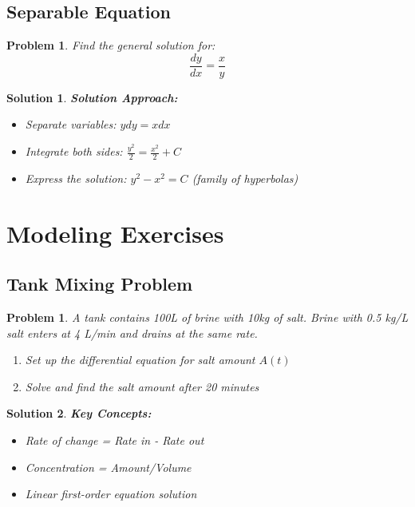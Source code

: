 \documentclass[12pt, letterpaper]{book}
\newcounter{problemcounter}[chapter]
\theoremstyle{problemstyle}
\newtheorem{problem}[problemcounter]{Problem}
\theoremstyle{solutionstyle}
\newtheorem*{solution}{Solution}
\begin{document}
\subsection{Separable Equation}

\begin{problem}
Find the general solution for:
$$\frac{dy}{dx} = \frac{x}{y}$$
\end{problem}

\begin{solution}
\textbf{Solution Approach:}
\begin{itemize}
    \item Separate variables: $y dy = x dx$
    \item Integrate both sides: $\frac{y^2}{2} = \frac{x^2}{2} + C$
    \item Express the solution: $y^2 - x^2 = C$ (family of hyperbolas)
\end{itemize}
\end{solution}

\section{Modeling Exercises}

\subsection{Tank Mixing Problem}

\begin{problem}
A tank contains 100L of brine with 10kg of salt. Brine with 0.5 kg/L salt enters at 4 L/min and drains at the same rate.
\begin{enumerate}
    \item Set up the differential equation for salt amount $A(t)$
    \item Solve and find the salt amount after 20 minutes
\end{enumerate}
\end{problem}

\begin{solution}
\textbf{Key Concepts:}
\begin{itemize}
    \item Rate of change = Rate in - Rate out
    \item Concentration = Amount/Volume
    \item Linear first-order equation solution
\end{itemize}
\end{solution}
\end{document}
